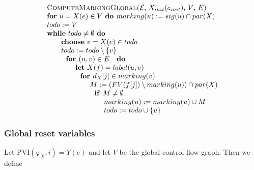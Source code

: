 \begin{equation*}
\begin{tabular}{l}
\textsc{ComputeMarkingGlobal(}$\mathcal{E}$, $X_{init}(e_{init})$, $V$, $E$%
\textsc{)} \\ 
\textbf{for} $u=X(e)\in V$ \textbf{do }$marking(u):=sig(u)\cap par(X)$ \\ 
$todo:=V$ \\ 
\textbf{while} $todo\neq \emptyset $ \textbf{do} \\ 
$\qquad $\textbf{choose} $v=X(e)\in todo$ \\ 
$\qquad todo:=todo\setminus \{v\}$ \\ 
$\qquad \text{\textbf{for }}(u,v)\in E\text{ \textbf{do}}$ \\ 
$\qquad \qquad $\textbf{let} $X(f)=label(u,v)$ \\ 
$\qquad \qquad \text{\textbf{for }}d_{X}[j]\in marking(v)$ \\ 
$\qquad \qquad \qquad M:=(FV(f[j])\setminus marking(u))\cap par(X)$ \\ 
$\qquad \qquad \qquad \text{\textbf{if }}M\neq \emptyset $ \\ 
$\qquad \qquad \qquad \qquad marking(u):=marking(u)\cup M$ \\ 
$\qquad \qquad \qquad \qquad todo:=todo\cup \{u\}$%
\end{tabular}%
\end{equation*}

\subsubsection{Global reset variables}

Let $\mathrm{PVI}(\varphi _{X},i)=Y(e)$ and let $V$ be the global control
flow graph. Then we define

